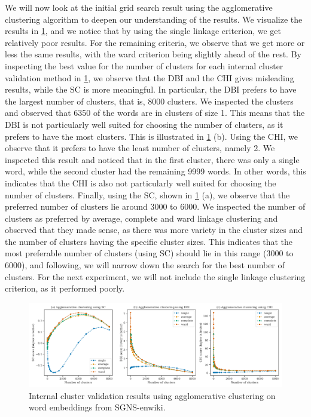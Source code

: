 We will now look at the initial grid search result using the agglomerative clustering algorithm to deepen our understanding of the results. We visualize the results in \cref{fig:cluster-analysis-agglomerative-internal-cluster-validation}, and we notice that by using the single linkage criterion, we get relatively poor results. For the remaining criteria, we observe that we get more or less the same results, with the ward criterion being slightly ahead of the rest. By inspecting the best value for the number of clusters for each internal cluster validation method in \cref{fig:cluster-analysis-agglomerative-internal-cluster-validation}, we observe that the DBI and the CHI gives misleading results, while the SC is more meaningful. In particular, the DBI prefers to have the largest number of clusters, that is, 8000 clusters. We inspected the clusters and observed that 6350 of the words are in clusters of size 1. This means that the DBI is not particularly well suited for choosing the number of clusters, as it prefers to have the most clusters. This is illustrated in \cref{fig:cluster-analysis-agglomerative-internal-cluster-validation} (b). Using the CHI, we observe that it prefers to have the least number of clusters, namely 2. We inspected this result and noticed that in the first cluster, there was only a single word, while the second cluster had the remaining 9999 words. In other words, this indicates that the CHI is also not particularly well suited for choosing the number of clusters. Finally, using the SC, shown in \cref{fig:cluster-analysis-agglomerative-internal-cluster-validation} (a), we observe that the preferred number of clusters lie around 3000 to 6000. We inspected the number of clusters as preferred by average, complete and ward linkage clustering and observed that they made sense, as there was more variety in the cluster sizes and the number of clusters having the specific cluster sizes. This indicates that the most preferable number of clusters (using SC) should lie in this range (3000 to 6000), and following, we will narrow down the search for the best number of clusters. For the next experiment, we will not include the single linkage clustering criterion, as it performed poorly.
\begin{figure}[H]
    \centering
    \includegraphics[width=\textwidth]{thesis/figures/cluster-analysis-agglomerative-internal-cluster-validation.pdf}
    \caption{Internal cluster validation results using agglomerative clustering on word embeddings from SGNS-enwiki.}
    \label{fig:cluster-analysis-agglomerative-internal-cluster-validation}
\end{figure}

